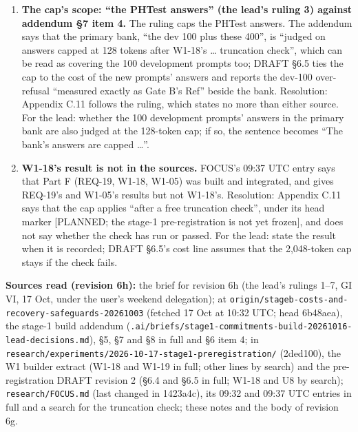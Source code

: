 \documentclass{article}
\theoremstyle{plain}
\theoremstyle{definition}
\theoremstyle{remark}
\begin{document}
\begin{enumerate}
        its fallback, the shared source stated as a limit in \S{}6 if the set
        cannot be built before the stage-1 freeze (S1) or stage 1b is not
        funded. Resolution: Appendix C.5 states the first branch (``If that set
        cannot be built before the freeze, the shared source is reported as a
        limit instead''); the second is moot there, because Appendix C.5's
        design runs only if funded. \S{}6's sentence: decision 56.
        \textbf{Revision 6h: RESOLVED (confirmed by the lead's ruling 5); text
        unchanged.} \S{}6 now states the shared source (decision 56).
  \item \textbf{The cap's scope: ``the PHTest answers'' (the lead's ruling 3)
        against addendum \S{}7 item 4.} The ruling caps the PHTest answers. The
        addendum says that the primary bank, ``the dev 100 plus these 400'', is
        ``judged on answers capped at 128 tokens after W1-18's \ldots{}
        truncation check'', which can be read as covering the 100 development
        prompts too; DRAFT \S{}6.5 ties the cap to the cost of the new prompts'
        answers and reports the dev-100 over-refusal ``measured exactly as Gate
        B's Ref'' beside the bank. Resolution: Appendix C.11 follows the ruling,
        which states no more than either source. For the lead: whether the 100
        development prompts' answers in the primary bank are also judged at the
        128-token cap; if so, the sentence becomes ``The bank's answers are
        capped \ldots{}''.
  \item \textbf{W1-18's result is not in the sources.} FOCUS's 09:37 UTC entry
        says that Part F (REQ-19, W1-18, W1-05) was built and integrated, and
        gives REQ-19's and W1-05's results but not W1-18's. Resolution: Appendix
        C.11 says that the cap applies ``after a free truncation check'', under
        its head marker [PLANNED; the stage-1 pre-registration is not yet
        frozen], and does not say whether the check has run or passed. For the
        lead: state the result when it is recorded; DRAFT \S{}6.5's cost line
        assumes that the 2,048-token cap stays if the check fails.
\end{enumerate}

\textbf{Sources read (revision 6h):} the brief for revision 6h (the lead's
rulings 1--7, GI VI, 17 Oct, under the user's weekend delegation); at
\nolinkurl{origin/stageb-costs-and-recovery-safeguards-20261003} (fetched 17 Oct
at 10:32 UTC; head 6b48aea), the stage-1 build addendum
(\nolinkurl{.ai/briefs/stage1-commitments-build-20261016-lead-decisions.md}),
\S{}5, \S{}7 and \S{}8 in full and \S{}6 item 4; in
\nolinkurl{research/experiments/2026-10-17-stage1-preregistration/} (2ded100),
the W1 builder extract (W1-18 and W1-19 in full; other lines by search) and the
pre-registration DRAFT revision 2 (\S{}6.4 and \S{}6.5 in full; W1-18 and U8 by
search); \nolinkurl{research/FOCUS.md} (last changed in 1423a4c), its 09:32 and
09:37 UTC entries in full and a search for the truncation check; these notes and
the body of revision 6g.
\end{document}
